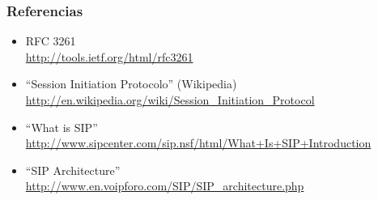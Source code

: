 \documentclass{beamer}
\begin{document}
\begin{frame}
\frametitle{Referencias}

\begin{itemize}
\item RFC 3261 \\
  \url{http://tools.ietf.org/html/rfc3261}
\item ``Session Initiation Protocolo'' (Wikipedia) \\
  \url{http://en.wikipedia.org/wiki/Session_Initiation_Protocol}
\item ``What is SIP'' \\
  \url{http://www.sipcenter.com/sip.nsf/html/What+Is+SIP+Introduction}
\item ``SIP Architecture'' \\
  \url{http://www.en.voipforo.com/SIP/SIP_architecture.php}
\end{itemize}

\end{frame}




\frame{
\maketitle
}
\end{document}
